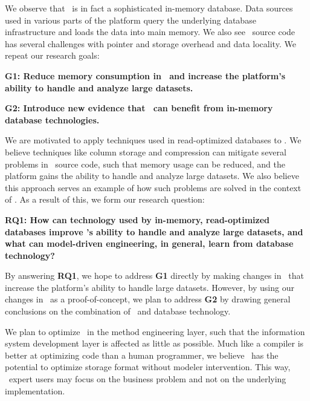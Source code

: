 We observe that \gap~is in fact a sophisticated in-memory database. Data sources used in various parts of the platform query the underlying database infrastructure and loads the data into main memory. We also see \gap~source code has several challenges with pointer and storage overhead and data locality. We repeat our research goals:

\setlength{\leftskip}{1cm}

\textbf{G1: Reduce memory consumption in \gap~and increase the platform's ability to handle and analyze large datasets.}

\textbf{G2: Introduce new evidence that \mde~can benefit from in-memory database technologies.}

\setlength{\leftskip}{0pt}

We are motivated to apply techniques used in read-optimized databases to \gap. We believe techniques like column storage and compression can mitigate several problems in \gap~source code, such that memory usage can be reduced, and the platform gains the ability to handle and analyze large datasets. We also believe this approach serves an example of how such problems are solved in the context of \mde. As a result of this, we form our research question:

\setlength{\leftskip}{1cm}

\textbf{RQ1: How can technology used by in-memory, read-optimized databases improve \gap's ability to handle and analyze large datasets, and what can model-driven engineering, in general, learn from database technology?}

\setlength{\leftskip}{0pt}

By answering \textbf{RQ1}, we hope to address \textbf{G1} directly by making changes in \gap~that increase the platform's ability to handle large datasets. However, by using our changes in \gap~as a proof-of-concept, we plan to address \textbf{G2} by drawing general conclusions on the combination of \mde~and database technology.

We plan to optimize \gap~in the method engineering layer, such that the information system development layer is affected as little as possible. Much like a compiler is better at optimizing code than a human programmer, we believe \gap~has the potential to optimize storage format without modeler intervention. This way, \gap~expert users may focus on the business problem and not on the underlying implementation. 
